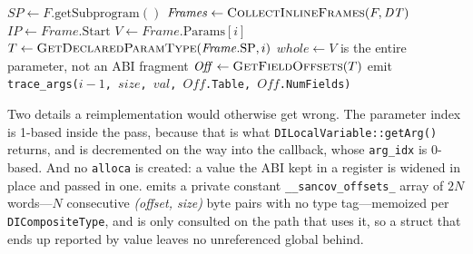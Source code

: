 \documentclass{article}
\begin{document}
\begin{algorithmic}[1]
  \State $\mathit{SP} \gets F.\mathrm{getSubprogram()}$
   \Return \EndIf
  \State $\mathit{Frames} \gets \Call{CollectInlineFrames}{F, \mathit{DT}}$
    \State $\mathit{IP} \gets \mathit{Frame}.\mathrm{Start}$
      \State $V \gets \mathit{Frame}.\mathrm{Params}[i]$
      \State $T \gets \Call{GetDeclaredParamType}{\mathit{Frame}.\mathrm{SP}, i}$
      \State $\mathit{whole} \gets V$ is the entire parameter, not an ABI fragment
        \State $\mathit{Off} \gets \Call{GetFieldOffsets}{T}$
        \State {}
      \Else
          \State {}
        \EndFor
      \EndIf
    \EndFor
  \EndFor
\EndFunction
\Statex
{}
  \State emit \texttt{trace\_args($i-1$, $\mathit{size}$, $\mathit{val}$, $\mathit{Off}$.Table, $\mathit{Off}$.NumFields)}
\EndFunction
\end{algorithmic}

\noindent Two details a reimplementation would otherwise get wrong. The
parameter index is 1-based inside the pass, because that is what
\texttt{DILocalVariable::getArg()} returns, and is decremented on the way into
the callback, whose \texttt{arg\_idx} is 0-based. And no \texttt{alloca} is
created: a value the ABI kept in a register is widened in place and passed in
one.  emits a private constant
\texttt{\_\_sancov\_offsets\_} array of $2N$ words---$N$ consecutive
\emph{(offset, size)} byte pairs with no type tag---memoized per
\texttt{DICompositeType}, and is only consulted on the path that uses it, so a
struct that ends up reported by value leaves no unreferenced global behind.
\end{document}
